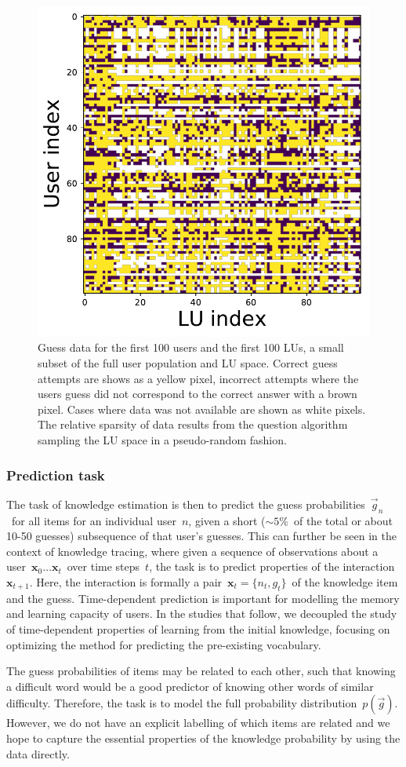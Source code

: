 \begin{figure}[ht]
\centering
\includegraphics[width=0.5\linewidth]{figures/lingvist/user_data.pdf}
\caption[Word pair (LU) guess data for a subset of users and words]{Guess data for the first 100 users and the first 100 LUs, a small subset of the full user population and LU space. Correct guess attempts are shows as a yellow pixel, incorrect attempts where the users guess did not correspond to the correct answer with a brown pixel. Cases where data was not available are shown as white pixels. The relative sparsity of data results from the question algorithm sampling the LU space in a pseudo-random fashion.} 
\label{fig:user_data} 
\end{figure} 

\subsubsection{Prediction task}
The task of knowledge estimation is then to predict the guess probabilities~$\vec{g}_n$~for all items for an individual user~$n$, given a short ($\sim5\%$~of the total or about 10-50 guesses) subsequence of that user's guesses. This can further be seen in the context of knowledge tracing, where given a sequence of observations about a user~$\mathbf{x}_0 \dots \mathbf{x}_t$~over time steps~$t$, the task is to predict properties of the interaction~$\mathbf{x}_{t+1}$. Here, the interaction is formally a pair~$\mathbf{x}_t = \{n_t, g_t\}$~of the knowledge item and the guess. Time-dependent prediction is important for modelling the memory and learning capacity of users. In the studies that follow, we decoupled the study of time-dependent properties of learning from the initial knowledge, focusing on optimizing the method for predicting the pre-existing vocabulary.

The guess probabilities of items may be related to each other, such that knowing a difficult word would be a good predictor of knowing other words of similar difficulty. Therefore, the task is to model the full probability distribution~$p(\vec{g})$. However, we do not have an explicit labelling of which items are related and we hope to capture the essential properties of the knowledge probability by using the data directly.

